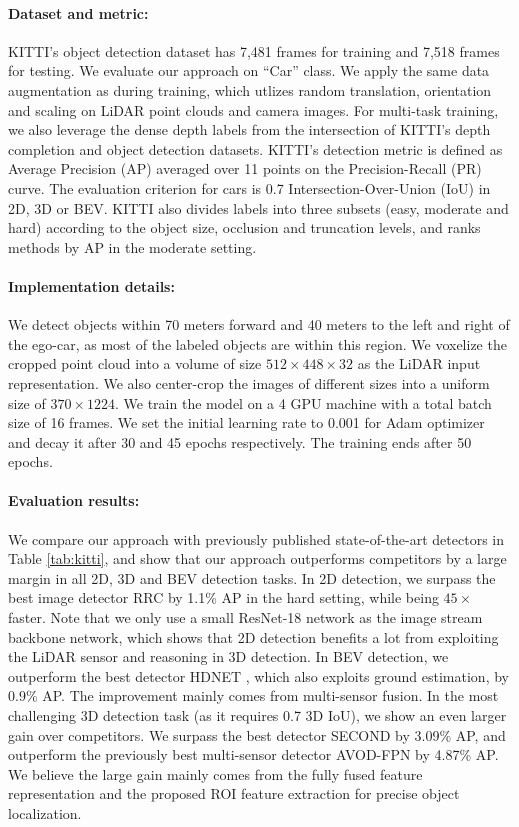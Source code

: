 \documentclass[10pt,twocolumn,letterpaper]{article}
\begin{document}
\paragraph{Dataset and metric:}
KITTI's object detection dataset has 7,481 frames for training and 7,518 frames for testing. We evaluate our approach on ``Car'' class. We  apply the same data augmentation as \cite{contfuse} during training, which utlizes random translation, orientation and scaling on LiDAR point clouds and camera images. For multi-task training, we also leverage the dense depth labels from the intersection of KITTI's depth completion  and object detection datasets. KITTI's detection metric is defined as Average Precision (AP) averaged over 11 points on the Precision-Recall (PR) curve. The evaluation criterion for cars is 0.7 Intersection-Over-Union (IoU) in 2D, 3D or BEV. KITTI also divides labels into three subsets (easy, moderate and hard) according to the object size, occlusion and truncation levels, and ranks methods by AP in the moderate setting.

\paragraph{Implementation details:}
We detect objects within 70 meters forward and 40 meters to the left and right of the ego-car, as most of the labeled objects are within this region. We voxelize the cropped point cloud into a volume of size $512\times448\times32$ as the LiDAR input representation. We also center-crop the images of different sizes into a uniform size of $370\times1224$. We train the model on a 4 GPU machine with a total batch size of 16 frames. We set the initial learning rate to 0.001 for Adam optimizer \cite{adam} and decay it after 30 and 45 epochs respectively. The training ends after 50 epochs.

\paragraph{Evaluation results:}
We compare our approach with previously published state-of-the-art detectors in Table \ref{tab:kitti}, and show that our approach outperforms competitors by a large margin in all 2D, 3D and BEV detection tasks. In 2D detection, we surpass the  best image detector RRC \cite{rrc} by 1.1\% AP in the hard setting, while being $45\times$ faster. Note that we only use a small ResNet-18 network as the image stream backbone network, which shows that 2D detection benefits a lot from exploiting the LiDAR sensor and reasoning in 3D detection. In BEV detection, we outperform the  best detector HDNET \cite{hdnet}, which also exploits ground estimation, by 0.9\% AP. The improvement mainly comes from multi-sensor fusion. In the most challenging 3D detection task (as it requires 0.7 3D IoU), we show an even larger gain over competitors. We surpass the  best detector SECOND \cite{second} by 3.09\% AP, and outperform the previously best multi-sensor detector AVOD-FPN \cite{avod} by 4.87\% AP. We believe the large gain mainly comes from the fully fused feature representation and the proposed ROI feature extraction for precise object localization.
\end{document}
